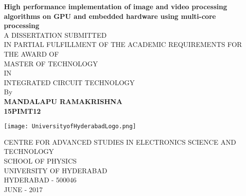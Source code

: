 %
\begin{titlepage}
	\begin{center}
		\vspace{0.5cm}	
	{\Large 	\textbf{High performance implementation of image and video processing algorithms on GPU and embedded hardware using multi-core processing\\}}
		\vspace*{1cm}
		{\small A DISSERTATION SUBMITTED \\
		IN PARTIAL FULFILLMENT OF THE ACADEMIC REQUIREMENTS FOR \\
		THE AWARD OF \\}
		\vspace{0.5cm}
		MASTER OF TECHNOLOGY \\
		IN \\
		INTEGRATED CIRCUIT TECHNOLOGY \\
		
		\vspace{1.5cm}
			By \\
		\textbf{MANDALAPU RAMAKRISHNA}\\
		\textbf{15PIMT12}
		
		\vspace{1.5cm}
		
		\texttt{[image: UniversityofHyderabadLogo.png]}
		
	{\scriptsize 	CENTRE FOR ADVANCED STUDIES IN ELECTRONICS SCIENCE AND TECHNOLOGY \\
		SCHOOL OF PHYSICS \\
		UNIVERSITY OF HYDERABAD \\
		HYDERABAD - 500046 \\
		JUNE - 2017 \\}
		
	\end{center}
\end{titlepage}
%